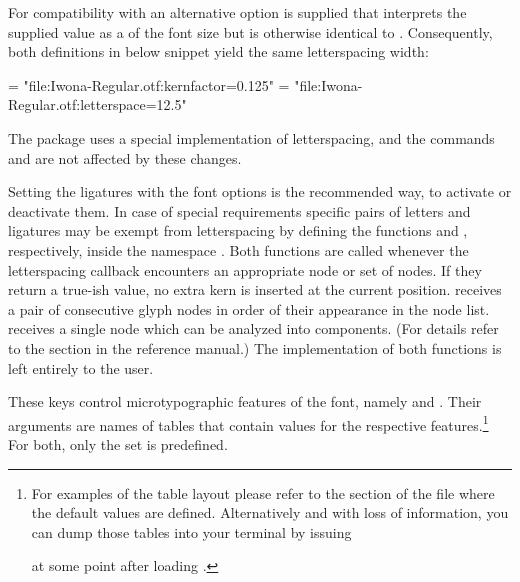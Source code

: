          For compatibility with \XETEX an alternative
          option is supplied that interprets the
         supplied value as a  of the font size but
         is otherwise identical to .
         Consequently, both definitions in below snippet yield the same
         letterspacing width:

         \beginlisting
    \font \iwonakernedA = "file:Iwona-Regular.otf:kernfactor=0.125"
    \font \iwonakernedB = "file:Iwona-Regular.otf:letterspace=12.5"
         \endlisting

         The  package uses a special implementation of letterspacing, and the commands \inlinecode{\lsstyle} and \inlinecode{\textls} are  not affected by these changes.

         Setting the ligatures with the font options is the recommended way, to activate or deactivate them. In case of special requirements
         specific pairs of letters and ligatures may be exempt from
         letterspacing by defining the \LUA functions
          and ,
         respectively, inside the namespace .
         Both functions are called whenever the letterspacing callback
         encounters an appropriate node or set of nodes.
         If they return a true-ish value, no extra kern is inserted at
         the current position.
          receives a pair of consecutive
         glyph nodes in order of their appearance in the node list.
          receives a single node which can be
         analyzed into components.
         (For details refer to the  section in the
         \LUATEX reference manual.)
         The implementation of both functions is left entirely to the
         user.
  \endaltitem

\iffalse
  \startbuffer [printvectors]
  \directlua{inspect(fonts.protrusions.setups.default)
             inspect(fonts.expansions.setups.default)}
  \stopbuffer
\fi

         These keys control microtypographic features of the font,
         namely  and .
         Their arguments are names of \LUA tables that contain
         values for the respective features.\footnote{%
            For examples of the table layout please refer to the
            section of the file  where the
            default values are defined.
            Alternatively and with loss of information, you can dump
            those tables into your terminal by issuing
            \unless \iffalse
              \beginlisting
 \directlua{inspect(fonts.protrusions.setups.default)
            inspect(fonts.expansions.setups.default)}
              \endlisting
            \else
              \typebuffer [printvectors]
            \fi
            at some point after loading .
         }
         For both, only the set  is predefined.

